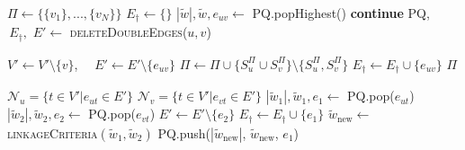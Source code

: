 \begin{algorithm}
\begin{algorithmic}[1]
      \State $\Pi \gets \{ \{v_1\}, ..., \{v_N\} \}$ 
      \State $E_\dagger \gets \{\}$ 
    \State
        \State $|\tilde{w}|, \tilde{w}, e_{uv} \gets $ PQ.popHighest()
            \State \textbf{continue}
        \EndIf
          \State PQ, $\,E_\dagger,\,\, E' \gets$ \textsc{deleteDoubleEdges}($u,v$)
          
          \State $V' \gets V' \setminus \{ v\}$, $\quad E' \gets E' \setminus \{ e_{uv}\}$
          \State $\Pi \gets \Pi \cup \{ S_u^\Pi \cup S_v^\Pi \} \setminus \{ S_u^\Pi, S_v^\Pi \}$
        \EndIf
          \State $ E_\dagger \gets E_\dagger \cup \{e_{uv} \} $
        \EndIf
      \EndWhile
      \State
      \Return $\Pi$

  \end{algorithmic}
  \hspace*{2cm} 
    \begin{algorithmic}[1]

      \State $\mathcal{N}_u = \{ t \in V' | e_{ut}\in E'  \}$
      \State $\mathcal{N}_v = \{ t \in V' | e_{vt}\in E'  \}$
        \State $|\tilde{w}_1|, \tilde{w}_1, e_1 \gets $ PQ.pop($e_{ut}$)
        \State $|\tilde{w}_2|, \tilde{w}_2, e_2 \gets $ PQ.pop($e_{vt}$)
        \State $E' \gets E' \setminus \{ e_2\}$ %
         
            \State $ E_\dagger \gets E_\dagger \cup \{e_1 \} $
        \EndIf
        \State $\tilde{w}_{\mathrm{new}} \gets$ \textsc{linkageCriteria}$(\tilde{w}_1, \tilde{w}_2)$
        \State PQ.push($|\tilde{w}_{\mathrm{new}}|$, $\tilde{w}_{\mathrm{new}}$,  $e_1$)
        

\end{algorithmic}
\end{algorithm}
